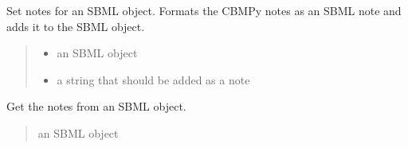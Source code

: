\documentclass[letterpaper,12pt,english]{sphinxmanual}
\begin{document}
\begin{fulllineitems}
\label{\detokenize{api/io:cbmpy.CBXML.sbml_setNotes3}}
\pysigstartsignatures
\pysiglinewithargsret
{}
{\sphinxparamcomma {}}
{}
\pysigstopsignatures
\sphinxAtStartPar
Set notes for an SBML object. Formats the CBMPy notes as an SBML note and adds it to the SBML object.
\begin{quote}\begin{description}
\begin{itemize}
\item {} 
\sphinxAtStartPar
{} \textendash{} an SBML object

\item {} 
\sphinxAtStartPar
{} \textendash{} a string that should be added as a note

\end{itemize}

\sphinxAtStartPar
{}

\end{description}\end{quote}

\end{fulllineitems}


\begin{fulllineitems}
\label{\detokenize{api/io:cbmpy.CBXML.sbml_getNotes}}
\pysigstartsignatures
\pysiglinewithargsret
{}
{}
{}
\pysigstopsignatures
\sphinxAtStartPar
Get the notes from an SBML object.
\begin{quote}\begin{description}
\sphinxAtStartPar
{} \textendash{} an SBML object

\sphinxAtStartPar
{}

\end{description}\end{quote}

\end{fulllineitems}
\end{document}
